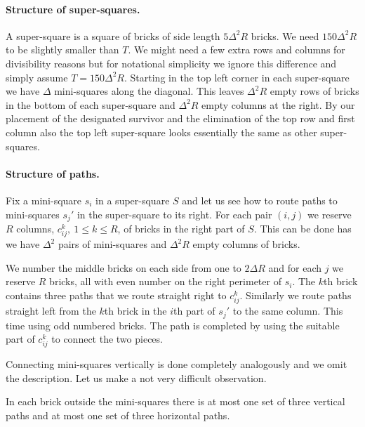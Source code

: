 \documentclass{article}\usepackage[a4paper,margin=20mm]{geometry}
\begin{document}
\paragraph{Structure of super-squares.}
A super-square
is a square of bricks of side length $5 \Delta^2 R$ bricks.
We need $150 \Delta^2 R$ to be slightly smaller than $T$.
We might need a few extra rows and columns for divisibility
reasons but for notational simplicity we ignore this difference
and simply assume $T=150 \Delta^2 R$.
Starting in the top left corner in each super-square
we have $\Delta$ mini-squares
along the diagonal.  This leaves $\Delta^2 R$ empty rows
of bricks in the bottom of each super-square and $\Delta^2 R$ empty
columns at the right.
By our placement of the designated survivor and the elimination
of the top row and first column also the top left super-square
looks essentially the same as other super-squares. 

\paragraph{Structure of paths.}
Fix a mini-square $s_i$ in a super-square $S$ and let us see how to
route paths to mini-squares $s_j'$ in the super-square to its right.  For
each pair $(i,j)$ we reserve $R$ columns, $c_{ij}^k, \ 1 \leq k \leq R$, 
of bricks in the right part of $S$.  This can be done has
we have $\Delta^2$ pairs of mini-squares and $\Delta^2 R$
empty columns of bricks.

We number the middle bricks on each side from
one to $2 \Delta R$ and for each $j$ we reserve $R$ bricks, 
all with even number
on the right perimeter of $s_i$.  The $k$th brick contains
three paths that we route straight right to $c_{ij}^k$.
Similarly we route paths straight left from the $k$th brick 
in the $i$th part of $s_j'$ to the same column.  This time
using odd numbered bricks.  The path is completed
by using the suitable part of $c_{ij}^k$ to connect the
two pieces.  

Connecting mini-squares vertically is done completely analogously
and we omit the description.  Let us make a not very difficult observation.

\begin{lemma}\label{lemma:disjoint paths}
In each brick outside the mini-squares there is
at most one set of three vertical paths and at most
one set of three horizontal paths.
\end{lemma}
\end{document}
